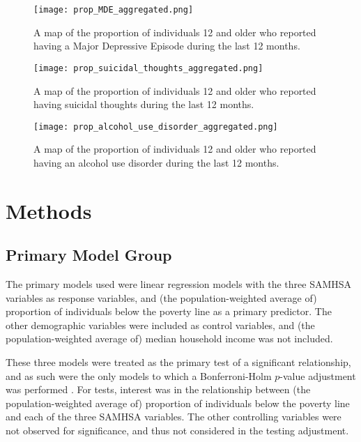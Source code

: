 \documentclass{article}
\begin{document}
\begin{figure}[!htb]
    \centering
    \texttt{[image: prop\_MDE\_aggregated.png]}
    \caption{A map of the proportion of individuals 12 and older who
	reported having a Major Depressive Episode during the last 12 months.}
    \label{fig:map-MDE}
\end{figure}

\begin{figure}[!htb]
    \centering
    \texttt{[image: prop\_suicidal\_thoughts\_aggregated.png]}
    \caption{A map of the proportion of individuals 12 and older who
	reported having suicidal thoughts during the last 12 months.}
    \label{fig:map-suicidal-thoughts}
\end{figure}

\begin{figure}[!htb]
    \centering
    \texttt{[image: prop\_alcohol\_use\_disorder\_aggregated.png]}
    \caption{A map of the proportion of individuals 12 and older who
	reported having an alcohol use disorder during the last 12 months.}
    \label{fig:map-alcohol-use}
\end{figure}


\section{Methods}

\subsection{Primary Model Group}

The primary models used were linear regression models with the three SAMHSA
variables as response variables, and
(the population-weighted average of)
proportion of individuals below the poverty line as a primary predictor.
The other demographic variables were included as control variables,
and
(the population-weighted average of)
median household income was not included.

These three models were treated as the primary test
of a significant relationship,
and as such were the only models to which a Bonferroni-Holm
$p$-value adjustment was performed \cite{holm}.
For tests, interest was in the relationship between
(the population-weighted average of)
proportion of individuals below the poverty line
and each of the three SAMHSA variables.
The other controlling variables were not
observed for significance,
and thus not considered in the testing adjustment.
\end{document}
